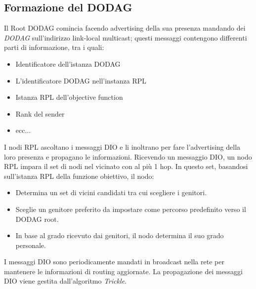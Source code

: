 \documentclass{article}
\begin{document}
\subsection{Formazione del DODAG}
Il Root DODAG comincia facendo advertising della sua presenza mandando dei \textit{DODAG} sull'indirizzo link-local multicast; questi messaggi contengono differenti parti di informazione, tra i quali: 
\begin{itemize}
    \item Identificatore dell'istanza DODAG
    \item L'identificatore DODAG nell'instanza RPL
    \item Istanza RPL dell'objective function
    \item Rank del sender
    \item ecc...
\end{itemize}
I nodi RPL ascoltano i messaggi DIO e li inoltrano per fare l'advertising della loro presenza e propagano le informazioni. Ricevendo un messaggio DIO, un nodo RPL impara il set di nodi nel vicinato con al più 1 hop. In questo set, basandosi sull'istanza RPL della funzione obiettivo, il nodo: 
\begin{itemize}
    \item Determina un set di vicini candidati tra cui scegliere i genitori.
    \item Sceglie un genitore preferito da impostare come percorso predefinito verso il DODAG root.
    \item In base al grado ricevuto dai genitori, il nodo determina il suo grado personale.
\end{itemize}
I messaggi DIO sono periodicamente mandati in broadcast nella rete per mantenere le informazioni di routing aggiornate. La propagazione dei messaggi DIO viene gestita dall'algoritmo \textit{Trickle}.
\end{document}
